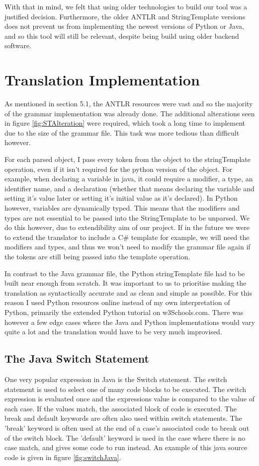 \documentclass{l4proj}
\begin{document}
With that in mind, we felt that using older technologies to build our tool was a justified decision. Furthermore, the older ANTLR and StringTemplate versions does not prevent us from implementing the newest versions of Python or Java, and so this tool will still be relevant, despite being build using older backend software.

\section{Translation Implementation}
As mentioned in section 5.1, the ANTLR resources were vast and so the majority of the grammar implementation was already done. The additional alterations seen in figure \ref{fig:STAlteration} were required, which took a long time to implement due to the size of the grammar file. This task was more tedious than difficult however.

For each parsed object, I pass every token from the object to the stringTemplate operation, even if it isn't required for the python version of the object. For example, when declaring a variable in java, it could require a modifier, a type, an identifier name, and a declaration (whether that means declaring the variable and setting it's value later or setting it's initial value as it's declared). In Python however, variables are dynamically typed. This means that the modifiers and types are not essential to be passed into the StringTemplate to be unparsed. We do this however, due to extendibility aim of our project. If in the future we were to extend the translator to include a C# template for example, we will need the modifiers and types, and thus we won't need to modify the grammar file again if the tokens are still being passed into the template operation.

In contrast to the Java grammar file, the Python stringTemplate file had to be built near enough from scratch. It was important to us to prioritise making the translation as syntactically accurate and as clean and simple as possible. For this reason I used Python resources online instead of my own interpretation of Python, primarily the extended Python tutorial on w3Schools.com. There was however a few edge cases where the Java and Python implementations would vary quite a lot and the translation would have to be very much improvised.

\subsection{The Java Switch Statement}
One very popular expression in Java is the Switch statement. The switch statement is used to select one of many code blocks to be executed. The switch expression is evaluated once and the expressions value is compared to the value of each case. If the values match, the associated block of code is executed. The break and default keywords are often also used within switch statements. The 'break' keyword is often used at the end of a case's associated code to break out of the switch block. The 'default' keyword is used in the case where there is no case match, and gives some code to run instead. An example of this java source code is given in figure \ref{fig:switchJava}.
\end{document}
